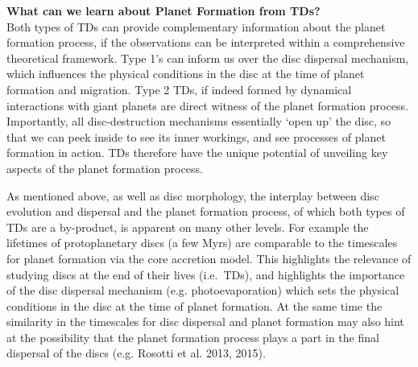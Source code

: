 \documentclass[12pt]{article}
\begin{document}
{\bf What can we learn about Planet Formation from TDs? }\\

Both types of TDs can provide complementary information about the
planet formation process, if the observations can be interpreted
within a comprehensive theoretical framework. Type 1's
can inform us over the disc dispersal mechanism, which influences the
physical conditions in the disc at the time of planet formation and
migration. Type 2 TDs, if indeed formed by dynamical interactions with
giant planets are direct witness of the planet formation
process. Importantly, all disc-destruction mechanisms essentially `open up' the
  disc, so that we can peek inside to see its inner workings, and see
  processes of planet formation in action. TDs therefore
  have the unique potential of unveiling key aspects of the planet formation
process.

As mentioned above, as well as disc morphology, the interplay between disc evolution and
dispersal and the planet formation process, of which both types of TDs
are a
by-product, is apparent on many other
 levels. For example the lifetimes of protoplanetary discs (a few
Myrs) are comparable to the timescales for planet formation via the core
accretion model. This highlights the relevance of studying discs at the end
of their lives (i.e.\ TDs), and highlights the importance
of the disc dispersal mechanism (e.g. photoevaporation) which sets the
physical conditions in the disc at the time of planet formation. 
At the same time the similarity in the timescales for disc dispersal
and planet formation may also hint at the possibility that the planet
formation process plays a part in the final dispersal of the discs
(e.g. Rosotti et al. 2013, 2015). 
\end{document}
